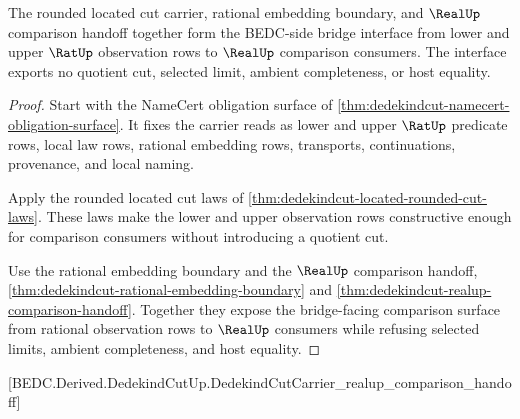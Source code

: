 \begin{theorem}
\label{thm:dedekindcut-bridged-real-comparison-interface}
The rounded located cut carrier, rational embedding boundary, and $\RealUp$ comparison handoff together form the BEDC-side bridge interface from lower and upper $\RatUp$ observation rows to $\RealUp$ comparison consumers. The interface exports no quotient cut, selected limit, ambient completeness, or host equality.
\end{theorem}
\begin{proof}
Start with the NameCert obligation surface of \autoref{thm:dedekindcut-namecert-obligation-surface}. It fixes the carrier reads as lower and upper $\RatUp$ predicate rows, local law rows, rational embedding rows, transports, continuations, provenance, and local naming.

Apply the rounded located cut laws of \autoref{thm:dedekindcut-located-rounded-cut-laws}. These laws make the lower and upper observation rows constructive enough for comparison consumers without introducing a quotient cut.

Use the rational embedding boundary and the $\RealUp$ comparison handoff, \autoref{thm:dedekindcut-rational-embedding-boundary} and \autoref{thm:dedekindcut-realup-comparison-handoff}. Together they expose the bridge-facing comparison surface from rational observation rows to $\RealUp$ consumers while refusing selected limits, ambient completeness, and host equality.
\end{proof}

[BEDC.Derived.DedekindCutUp.DedekindCutCarrier\_realup\_comparison\_handoff]

\begin{closurestatus}{\DedekindCutUp}
  \theoryclosure{\matureClosure}
  \formalstatus{\auditCleanV}
\end{closurestatus}
